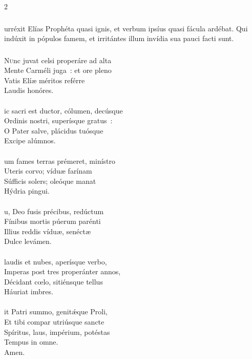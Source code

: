 \documentclass[9pt,twoside]{extarticle}
\begin{document}
\begin{multicols}{2}
{\subsubsection*{}
urréxit Elías Prophéta quasi ignis, et verbum ipsíus quasi fácula ardébat. Qui indúxit in pópulos famem, et irritántes illum invídia sua pauci facti sunt.

\subsubsection*{\center {}}
\lettrine{N}unc juvat celsi properáre ad alta\\
Mente Carméli juga~: et ore pleno\\
Vatis Elíæ méritos reférre\\
Laudis honóres.\\
\\
ic sacri est ductor, cólumen, decúsque\\
Ordinis nostri, superísque gratus~:\\
O Pater salve, plácidus tuósque\\
Excipe alúmnos.\\
\\
um fames terras prémeret, minístro\\
Uteris corvo; víduæ farínam\\
Súfficis solers; oleóque manat\\
Hýdria pingui.\\
\\
u, Deo fusis précibus, redúctum\\
Fínibus mortis púerum parénti\\
Illius reddis víduæ, senéctæ\\
Dulce levámen.\\
\\
laudis et nubes, aperísque verbo,\\
Imperas post tres properánter annos,\\
Décidant cœlo, sitiénsque tellus\\
Háuriat imbres.\\
\\
it Patri summo, genitǽque Proli,\\
Et tibi compar utriúsque sancte\\
Spíritus, laus, impérium, potéstas\\
Tempus in omne.\\
Amen.

}
\end{multicols}
\end{document}
